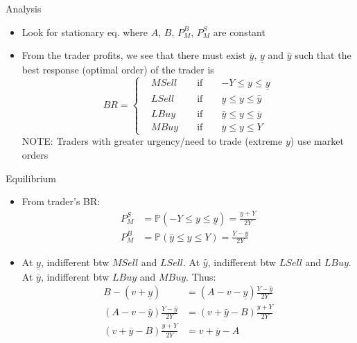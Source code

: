 \documentclass[english,10pt
,aspectratio=169
]{beamer}
\begin{document}
\begin{frame}{Analysis}
	\begin{itemize}
		\item Look for stationary eq. where  $A$, $B$, $P^B_M$, $P^S_M$ are constant 
		\item From the trader profits, we see that there must exist $\overline{y}$,  $\underline{y}$ and $\hat{y}$ such that the best response (optimal order) of the trader is
		\begin{equation*}
		BR=\left\{ \begin{aligned}
		&MSell		&& 	\text{ if } 	&&	-Y\le y \le \underline{y} \\
		&LSell 		&&	\text{ if } 	&&	\underline{y} \le y \le \hat{y} \\
		&LBuy		&&	\text{ if } 	&&	\hat{y} \le y \le \overline{y} \\
		&MBuy	&&	\text{ if } 	&&	\overline{y} \le y \le Y
		\end{aligned}
		\right.
		\end{equation*}
		NOTE: Traders with greater urgency/need to trade (extreme $y$) use market orders
	\end{itemize}
\end{frame}


\begin{frame}{Equilibrium}
	\begin{itemize}
		\item From trader's BR:
		\begin{align*}
		P^S_M 	&=\mathbb{P}(-Y\le y \le \underline{y})=\frac{\underline{y}+Y}{2Y} \\
		P^B_M 	&=\mathbb{P}(\overline{y} \le y \le Y)=\frac{Y-\overline{y}}{2Y}
		\end{align*}
		\pause
		\item At $\underline{y}$, indifferent btw $MSell$ and $LSell$. At $\hat{y}$, indifferent btw $LSell$ and $LBuy$. At $\overline{y}$, indifferent btw $LBuy$ and $MBuy$. Thus:
		\begin{align}
		B-(v+\underline{y}) 					& = (A-v-\underline{y})\frac{Y-\overline{y}}{2Y} \label{eq1}\\
		(A-v-\hat{y}) \frac{Y-\overline{y}}{2Y} 			& = (v+\hat{y}-B)\frac{\underline{y}+Y}{2Y} \label{eq2}\\
		(v+\overline{y}-B) \frac{\underline{y}+Y}{2Y}  	& = v+\overline{y}-A \label{eq3}
		\end{align}
	\end{itemize}
\end{frame}
\end{document}

